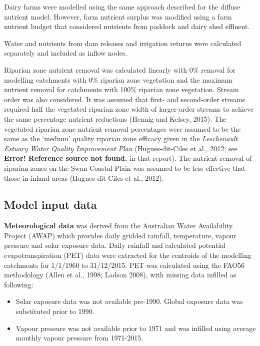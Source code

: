 \documentclass[
]{book}
\begin{document}
Dairy farms were modelled using the same approach described for the diffuse nutrient model. However, farm nutrient surplus was modified using a farm nutrient budget that considered nutrients from paddock and dairy shed effluent.~

Water and nutrients from dam releases and irrigation returns were calculated separately and included as inflow nodes.~

Riparian zone nutrient removal was calculated linearly with 0\% removal for modelling catchments with 0\% riparian zone vegetation and the maximum nutrient removal for catchments with 100\% riparian zone vegetation. Stream order was also considered. It was assumed that first- and second-order streams required half the vegetated riparian zone width of larger-order streams to achieve the same percentage nutrient reductions (Hennig and Kelsey, 2015). The vegetated riparian zone nutrient-removal percentages were assumed to be the same as the `medium' quality riparian zone efficacy given in the \emph{Leschenault Estuary Water Quality Improvement Plan} (Hugues-dit-Ciles et al., 2012; see \textbf{Error! Reference source not found.} in that report). The nutrient removal of riparian zones on the Swan Coastal Plain was assumed to be less effective that those in inland areas (Hugues-dit-Ciles et al., 2012).

\hypertarget{model-input-data}{%
\subsection{Model input data}\label{model-input-data}}

\textbf{Meteorological data} was derived from the Australian Water Availability Project (AWAP) which provides daily gridded rainfall, temperature, vapour pressure and solar exposure data. Daily rainfall and calculated potential evapotranspiration (PET) data were extracted for the centroids of the modelling catchments for 1/1/1960 to 31/12/2015. PET was calculated using the FAO56 methodology (Allen et al., 1998; Ladson 2008), with missing data infilled as following:

\begin{itemize}
\item
  Solar exposure data was not available pre-1990. Global exposure data was substituted prior to 1990.~
\item
  Vapour pressure was not available prior to 1971 and was infilled using average monthly vapour pressure from 1971-2015.
\end{itemize}
\end{document}
